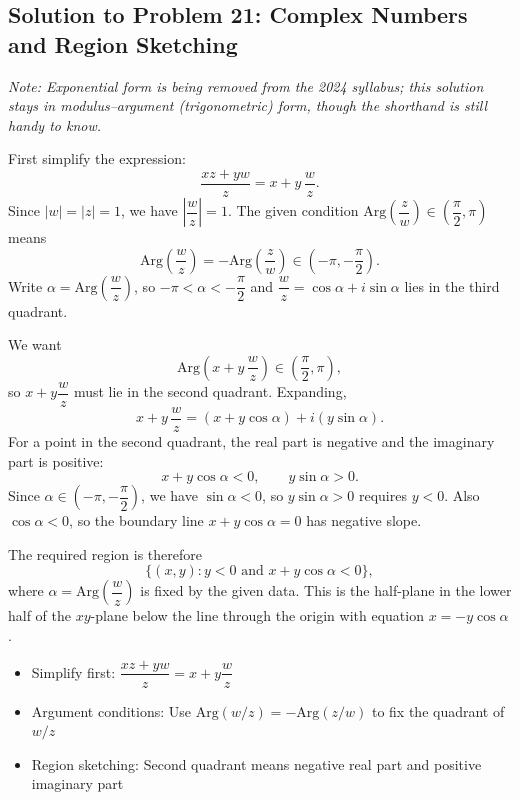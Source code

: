 \subsection{Solution to Problem 21: Complex Numbers and Region Sketching}

\begin{solution}
\textit{Note: Exponential form is being removed from the 2024 syllabus; this solution stays in modulus--argument (trigonometric) form, though the shorthand is still handy to know.}

First simplify the expression:
\[
\frac{xz+yw}{z} = x + y\,\frac{w}{z}.
\]
Since $|w| = |z| = 1$, we have $\left|\dfrac{w}{z}\right| = 1$. The given condition
$\text{Arg}\!\left(\dfrac{z}{w}\right) \in \left(\dfrac{\pi}{2}, \pi\right)$ means
\[
\text{Arg}\!\left(\frac{w}{z}\right) = -\text{Arg}\!\left(\frac{z}{w}\right) \in \left(-\pi, -\frac{\pi}{2}\right).
\]
Write $\alpha = \text{Arg}\!\left(\dfrac{w}{z}\right)$, so $-\pi < \alpha < -\dfrac{\pi}{2}$ and
$\dfrac{w}{z} = \cos\alpha + i\sin\alpha$ lies in the third quadrant.

We want
\[
\text{Arg}\!\left(x + y\,\frac{w}{z}\right) \in \left(\frac{\pi}{2}, \pi\right),
\]
so $x + y\dfrac{w}{z}$ must lie in the second quadrant. Expanding,
\[
x + y\,\frac{w}{z} = (x + y\cos\alpha) + i(y\sin\alpha).
\]
For a point in the second quadrant, the real part is negative and the imaginary part is positive:
\[
x + y\cos\alpha < 0, \qquad y\sin\alpha > 0.
\]
Since $\alpha \in \left(-\pi, -\dfrac{\pi}{2}\right)$, we have $\sin\alpha < 0$, so $y\sin\alpha > 0$ requires $y < 0$.
Also $\cos\alpha < 0$, so the boundary line $x + y\cos\alpha = 0$ has negative slope.

The required region is therefore
\[
\{(x,y) : y < 0 \text{ and } x + y\cos\alpha < 0\},
\]
where $\alpha = \text{Arg}\!\left(\dfrac{w}{z}\right)$ is fixed by the given data. This is the half-plane in the lower half of the $xy$-plane below the line through the origin with equation $x = -y\cos\alpha$.
\end{solution}

\begin{takeaways}
\begin{itemize}
    \item Simplify first: $\dfrac{xz+yw}{z} = x + y\dfrac{w}{z}$
    \item Argument conditions: Use $\text{Arg}(w/z) = -\text{Arg}(z/w)$ to fix the quadrant of $w/z$
    \item Region sketching: Second quadrant means negative real part and positive imaginary part
\end{itemize}
\end{takeaways}
